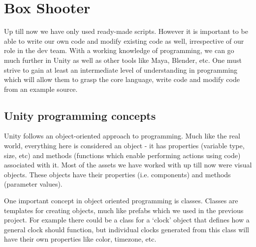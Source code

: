 \documentclass{article}[a4paper,12pt]
\theoremstyle{definition}
\begin{document}
\pagebreak
\section{Box Shooter}
Up till now we have only used ready-made scripts. However it is important to be able to write our own code and modify existing code as well, irrespective of our role in the dev team. With a working knowledge of programming, we can go much further in Unity as well as other tools like Maya, Blender, etc. One must strive to gain at least an intermediate level of understanding in programming which will allow them to grasp the core language, write code and modify code from an example source.

\subsection{Unity programming concepts}
Unity follows an object-oriented approach to programming. Much like the real world, everything here is considered an object - it has properties (variable type, size, etc) and methods (functions which enable performing actions using code) associated with it. Most of the assets we have worked with up till now were visual objects. These objects have their properties (i.e. components) and methods (parameter values).
\vspace{6pt}

One important concept in object oriented programming is classes. Classes are templates for creating objects, much like prefabs which we used in the previous project. For example there could be a class for a 	`clock' object that defines how a general clock should function, but individual clocks generated from this class will have their own properties like color, timezone, etc.
\vspace{6pt}
\end{document}
